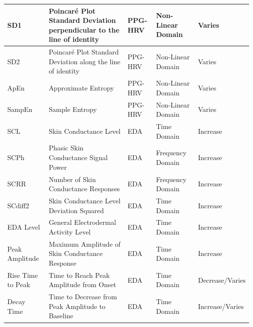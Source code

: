 \begin{table}[h]
{\begin{tabular}{|l|p{4cm}|l|l|l|}
  SD1                      & Poincaré Plot Standard Deviation perpendicular to the line of identity     & PPG-HRV & Non-Linear Domain & Varies                     \\ \hline
  SD2                      & Poincaré Plot Standard Deviation along the line of identity                & PPG-HRV & Non-Linear Domain & Varies                     \\ \hline
  ApEn                     & Approximate Entropy                                        & PPG-HRV                & Non-Linear Domain & Varies                                  \\ \hline
  SampEn                   & Sample Entropy                                             & PPG-HRV                & Non-Linear Domain & Varies                                  \\ \hline
  SCL                      & Skin Conductance Level                                     & EDA                    & Time Domain     & Increase                                \\ \hline
  SCPh                     & Phasic Skin Conductance Signal Power                       & EDA                    & Frequency Domain & Increase                                \\ \hline
  SCRR                     & Number of Skin Conductance Responses                       & EDA                    & Frequency Domain & Increase                                \\ \hline
  SCdiff2                  & Skin Conductance Level Deviation Squared                   & EDA                    & Time Domain     & Increase                                \\ \hline
  EDA Level                & General Electrodermal Activity Level                       & EDA                    & Time Domain     & Increase                                \\ \hline
  Peak Amplitude           & Maximum Amplitude of Skin Conductance Response             & EDA                    & Time Domain     & Increase                                \\ \hline
  Rise Time to Peak        & Time to Reach Peak Amplitude from Onset                    & EDA                    & Time Domain     & Decrease/Varies                         \\ \hline
  Decay Time               & Time to Decrease from Peak Amplitude to Baseline           & EDA                    & Time Domain     & Increase/Varies                         \\ \hline

\end{tabular}}
\end{table}
